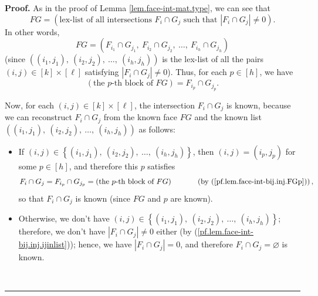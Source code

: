 \documentclass[12pt]{article}
\theoremstyle{definition}%
\theoremstyle{definition}%
\theoremstyle{remark}%
\newcommand{\interval}[1]{\left[ #1 \right]} %
\newenvironment{proof}[1][Proof]{\noindent\textbf{#1.} }{\ \rule{0.5em}{0.5em}}
\begin{document}
\begin{proof}
As in the proof of Lemma \ref{lem.face-int-mat.type}, we can see that
\begin{equation}
FG=\left(  \text{lex-list of all intersections }F_{i}\cap G_{j}\text{ such
that }\left\vert F_{i}\cap G_{j}\right\vert \neq0\right)  .
\label{pf.lem.face-int-bij.inj.FG=lex}
\end{equation}
In other words,
\begin{equation}
FG=\left(  F_{i_{1}}\cap G_{j_{1}},\ F_{i_{2}}\cap G_{j_{2}},\ \ldots
,\ F_{i_{h}}\cap G_{j_{h}}\right)
\label{pf.lem.face-int-bij.inj.FG=list}
\end{equation}
(since $\left(  \left(  i_{1},j_{1}\right)  ,\ \left(  i_{2},j_{2}\right)
,\ \ldots,\ \left(  i_{h},j_{h}\right)  \right)  $ is the lex-list of all the
pairs $\left(  i,j\right)  \in\interval{k}  \times\interval{\ell}$
satisfying $\left\vert F_{i}\cap G_{j}\right\vert \neq0$). Thus, for each
$p\in\interval{h}$, we have
\begin{equation}
\left(  \text{the }p\text{-th block of }FG\right)  =F_{i_{p}}\cap G_{j_{p}}.
\label{pf.lem.face-int-bij.inj.FGp}
\end{equation}


Now, for each $\left(  i,j\right)  \in\interval{k}  \times
\interval{\ell}$, the intersection $F_{i}\cap G_{j}$ is known, because we can
reconstruct $F_{i}\cap G_{j}$ from the known face $FG$ and the known list
$\left(  \left(  i_{1},j_{1}\right)  ,\ \left(  i_{2},j_{2}\right)
,\ \ldots,\ \left(  i_{h},j_{h}\right)  \right)  $ as follows:

\begin{itemize}
\item If $\left(  i,j\right)  \in\left\{  \left(  i_{1},j_{1}\right)
,\ \left(  i_{2},j_{2}\right)  ,\ \ldots,\ \left(  i_{h},j_{h}\right)
\right\}  $, then $\left(  i,j\right)  =\left(  i_{p},j_{p}\right)  $ for some
$p\in\interval{h}$, and therefore this $p$ satisfies
\[
F_{i}\cap G_{j}=F_{i_{p}}\cap G_{j_{p}}=\left(  \text{the }p\text{-th block of
}FG\right)  \ \ \ \ \ \ \ \ \ \ \left(  \text{by
(\ref{pf.lem.face-int-bij.inj.FGp})}\right)  ,
\]
so that $F_{i}\cap G_{j}$ is known (since $FG$ and $p$ are known).

\item Otherwise, we don't have $\left(  i,j\right)  \in\left\{  \left(
i_{1},j_{1}\right)  ,\ \left(  i_{2},j_{2}\right)  ,\ \ldots,\ \left(
i_{h},j_{h}\right)  \right\}  $; therefore, we don't have $\left\vert
F_{i}\cap G_{j}\right\vert \neq0$ either (by
(\ref{pf.lem.face-int-bij.inj.ijinlist})); hence, we have $\left\vert
F_{i}\cap G_{j}\right\vert =0$, and therefore $F_{i}\cap G_{j}=\varnothing$ is known.
\end{itemize}


\end{proof}
\end{document}
